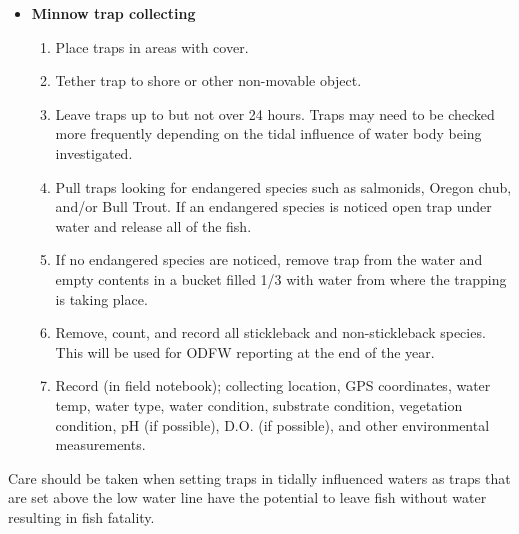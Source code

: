 \documentclass[
  letterpaper,
  DIV=11,
  numbers=noendperiod]{scrreprt}
\begin{document}
\begin{itemize}
\item
  \textbf{Minnow trap collecting}

  \begin{enumerate}
  \def\labelenumi{\arabic{enumi}.}
  \item
    Place traps in areas with cover.
  \item
    Tether trap to shore or other non-movable object.
  \item
    Leave traps up to but not over 24 hours. Traps may need to be
    checked more frequently depending on the tidal influence of water
    body being investigated.
  \item
    Pull traps looking for endangered species such as salmonids, Oregon
    chub, and/or Bull Trout. If an endangered species is noticed open
    trap under water and release all of the fish.
  \item
    If no endangered species are noticed, remove trap from the water and
    empty contents in a bucket filled 1/3 with water from where the
    trapping is taking place.
  \item
    Remove, count, and record all stickleback and non-stickleback
    species. This will be used for ODFW reporting at the end of the
    year.
  \item
    Record (in field notebook); collecting location, GPS coordinates,
    water temp, water type, water condition, substrate condition,
    vegetation condition, pH (if possible), D.O. (if possible), and
    other environmental measurements.
  \end{enumerate}
\end{itemize}

\begin{tcolorbox}[enhanced jigsaw, rightrule=.15mm, title=\textcolor{quarto-callout-warning-color}{\faExclamationTriangle}\hspace{0.5em}{TRAP PLACEMENT}, titlerule=0mm, opacitybacktitle=0.6, toprule=.15mm, bottomrule=.15mm, opacityback=0, left=2mm, colframe=quarto-callout-warning-color-frame, breakable, coltitle=black, colback=white, colbacktitle=quarto-callout-warning-color!10!white, bottomtitle=1mm, leftrule=.75mm, toptitle=1mm, arc=.35mm]

Care should be taken when setting traps in tidally influenced waters as
traps that are set above the low water line have the potential to leave
fish without water resulting in fish fatality.

\end{tcolorbox}
\end{document}
